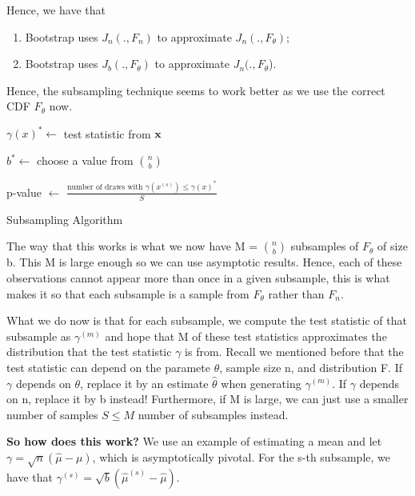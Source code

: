 \documentclass[twoside]{article}
\begin{document}
Hence, we have that

\begin{enumerate}
  \item Bootstrap uses $J_n(.,F_n)$ to approximate $J_n(.,F_{\theta})$;
  \item Bootstrap uses $J_b(.,F_{\theta})$ to approximate $J_n(.,F_{\theta}$).
\end{enumerate}

Hence, the subsampling technique seems to work better as we use the correct CDF $F_{\theta}$ now. 

\begin{algorithm}
\DontPrintSemicolon
{}

$\gamma(x)^* \gets$ test statistic from $\textbf{x}$\;

$b^* \gets$ choose a value from ${n \choose b}$\;

p-value $\gets$ $\frac{\text{number of draws with }\gamma(x^{(s)})\leq\gamma(x)^*}{S}$\;

\caption{{\sc Subsampling Algorithm}}
\label{algo:duplicate}
\end{algorithm}

The way that this works is what we now have M = $n \choose b$ subsamples of $F_{\theta}$ of size b. This M is large enough so we can use asymptotic results. Hence, each of these observations cannot appear more than once in a given subsample, this is what makes it so that each subsample is a sample from $F_{\theta}$ rather than $F_n$.

What we do now is that for each subsample, we compute the test statistic of that subsample as $\gamma^{(m)}$ and hope that M of these test statistics approximates the distribution that the test statistic $\gamma$ is from. Recall we mentioned before that the test statistic can depend on the paramete $\theta$, sample size n, and distribution F. If $\gamma$ depends on $\theta$, replace it by an estimate $\hat{\theta}$ when generating $\gamma^{(m)}$. If $\gamma$ depends on n, replace it by b instead! Furthermore, if M is large, we can just use a smaller number of samples $S \leq M$ number of subsamples instead.


\textbf{So how does this work?}
We use an example of estimating a mean and let $\gamma = \sqrt{n}(\hat{\mu} - \mu)$, which is asymptotically pivotal. For the s-th subsample, we have that $\gamma^{(s)} = \sqrt{b}(\hat{\mu}^{(s)} - \hat{\mu})$. 
\end{document}
